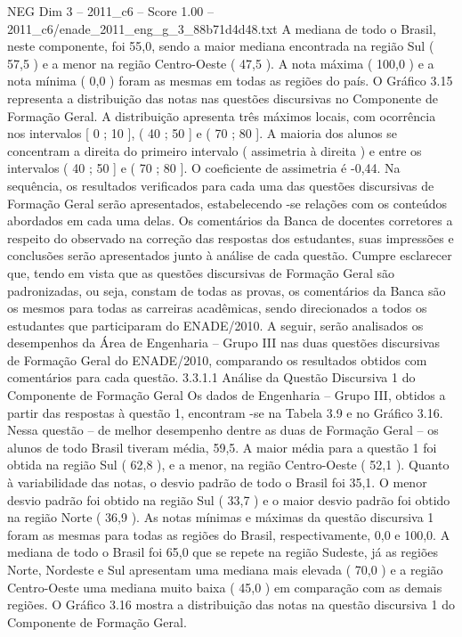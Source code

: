 \begin{textsample}{NEG Dim 3 – 2011\_c6 – Score 1.00 – 2011\_c6/enade\_2011\_eng\_g\_3\_88b71d4d48.txt}
A mediana de todo o Brasil, neste componente, foi 55,0, sendo a maior mediana encontrada na região Sul ( 57,5 ) e a menor na região Centro-Oeste ( 47,5 ).
A nota máxima ( 100,0 ) e a nota mínima ( 0,0 ) foram as mesmas em todas as regiões do país.
O Gráfico 3.15 representa a distribuição das notas nas questões discursivas no Componente de Formação Geral.
A distribuição apresenta três máximos locais, com ocorrência nos intervalos [ 0 ; 10 ], ( 40 ; 50 ] e ( 70 ; 80 ].
A maioria dos alunos se concentram a direita do primeiro intervalo ( assimetria à direita ) e entre os intervalos ( 40 ; 50 ] e ( 70 ; 80 ].
O coeficiente de assimetria é -0,44.
Na sequência, os resultados verificados para cada uma das questões discursivas de Formação Geral serão apresentados, estabelecendo -se relações com os conteúdos abordados em cada uma delas.
Os comentários da Banca de docentes corretores a respeito do observado na correção das respostas dos estudantes, suas impressões e conclusões serão apresentados junto à análise de cada questão.
Cumpre esclarecer que, tendo em vista que as questões discursivas de Formação Geral são padronizadas, ou seja, constam de todas as provas, os comentários da Banca são os mesmos para todas as carreiras acadêmicas, sendo direcionados a todos os estudantes que participaram do ENADE/2010.
A seguir, serão analisados os desempenhos da Área de Engenharia – Grupo III nas duas questões discursivas de Formação Geral do ENADE/2010, comparando os resultados obtidos com comentários para cada questão. 3.3.1.1 Análise da Questão Discursiva 1 do Componente de Formação Geral Os dados de Engenharia – Grupo III, obtidos a partir das respostas à questão 1, encontram -se na Tabela 3.9 e no Gráfico 3.16.
Nessa questão – de melhor desempenho dentre as duas de Formação Geral – os alunos de todo Brasil tiveram média, 59,5.
A maior média para a questão 1 foi obtida na região Sul ( 62,8 ), e a menor, na região Centro-Oeste ( 52,1 ).
Quanto à variabilidade das notas, o desvio padrão de todo o Brasil foi 35,1.
O menor desvio padrão foi obtido na região Sul ( 33,7 ) e o maior desvio padrão foi obtido na região Norte ( 36,9 ).
As notas mínimas e máximas da questão discursiva 1 foram as mesmas para todas as regiões do Brasil, respectivamente, 0,0 e 100,0.
A mediana de todo o Brasil foi 65,0 que se repete na região Sudeste, já as regiões Norte, Nordeste e Sul apresentam uma mediana mais elevada ( 70,0 ) e a região Centro-Oeste uma mediana muito baixa ( 45,0 ) em comparação com as demais regiões.
O Gráfico 3.16 mostra a distribuição das notas na questão discursiva 1 do Componente de Formação Geral.

\end{textsample}

